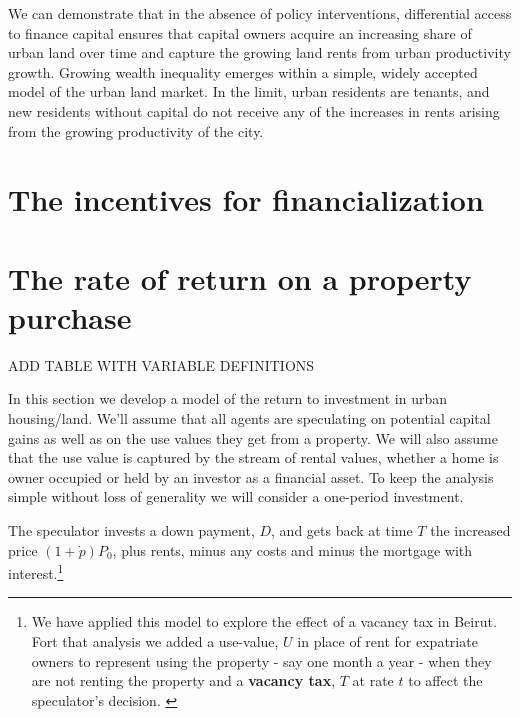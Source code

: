 We can demonstrate  that  in the absence of policy interventions, differential access to finance capital ensures that capital owners acquire an increasing share of urban land over time and capture the growing  land rents  from urban productivity growth. Growing wealth inequality emerges within a simple, widely accepted model of the urban land market. In the limit,  urban residents are tenants, and new residents  without capital do  not receive any of the increases in rents arising from the growing productivity of the city. 





\section{The incentives for financialization}%

  





\section{The rate of return on a property purchase}


ADD TABLE WITH VARIABLE DEFINITIONS
 
 In this section we develop a model of the return to investment in urban housing/land. We'll assume that all agents are speculating on potential capital gains as well as on the use values they get from a property.  We will also assume that the use value is captured by the stream of rental values, whether a home is owner occupied or  held by an investor as a financial asset. To keep the analysis simple without loss of generality we will consider a one-period investment.
 
 The speculator  invests a down payment, $D$, and gets back at time $T$ the  increased price $(1+\dot p)P_0$, plus rents, minus any costs and minus the mortgage with interest.\footnote{We have applied this model to explore the effect of a vacancy tax in Beirut.  Fort that analysis we  added a use-value, $U$ in place of rent for expatriate owners to represent using the property - say one month a year - when they are not renting the property and a \textbf{vacancy tax}, $T$ at rate $t$ to affect the speculator's  decision. \cite{Al-Shihabi}}


